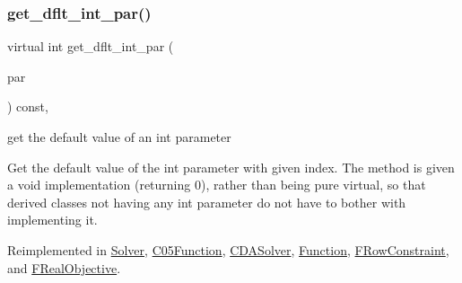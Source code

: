 \subsubsection{\texorpdfstring{get\+\_\+dflt\+\_\+int\+\_\+par()}{get\_dflt\_int\_par()}}
{\footnotesize\ttfamily virtual int get\+\_\+dflt\+\_\+int\+\_\+par (\begin{DoxyParamCaption}\item[{const \mbox{\hyperlink{class_s_m_spp__di__unipi__it_1_1_thin_compute_interface_aa3d710629ad8c434286726ad810c3b47}{idx\+\_\+type}}}]{par }\end{DoxyParamCaption}) const\hspace{0.3cm}{\ttfamily [inline]}, {\ttfamily [virtual]}}



get the default value of an int parameter 

Get the default value of the int parameter with given index. The method is given a void implementation (returning 0), rather than being pure virtual, so that derived classes not having any int parameter do not have to bother with implementing it. 

Reimplemented in \mbox{\hyperlink{class_s_m_spp__di__unipi__it_1_1_solver_a75dd1491b74c4b9476755e061dce3e04}{Solver}}, \mbox{\hyperlink{class_s_m_spp__di__unipi__it_1_1_c05_function_a75dd1491b74c4b9476755e061dce3e04}{C05\+Function}}, \mbox{\hyperlink{class_s_m_spp__di__unipi__it_1_1_c_d_a_solver_a75dd1491b74c4b9476755e061dce3e04}{C\+D\+A\+Solver}}, \mbox{\hyperlink{class_s_m_spp__di__unipi__it_1_1_function_a75dd1491b74c4b9476755e061dce3e04}{Function}}, \mbox{\hyperlink{class_s_m_spp__di__unipi__it_1_1_f_row_constraint_a75dd1491b74c4b9476755e061dce3e04}{F\+Row\+Constraint}}, and \mbox{\hyperlink{class_s_m_spp__di__unipi__it_1_1_f_real_objective_a75dd1491b74c4b9476755e061dce3e04}{F\+Real\+Objective}}.

\mbox{\label{class_s_m_spp__di__unipi__it_1_1_thin_compute_interface_a0b058687744cfc2e91a20187c56566ca}} 
